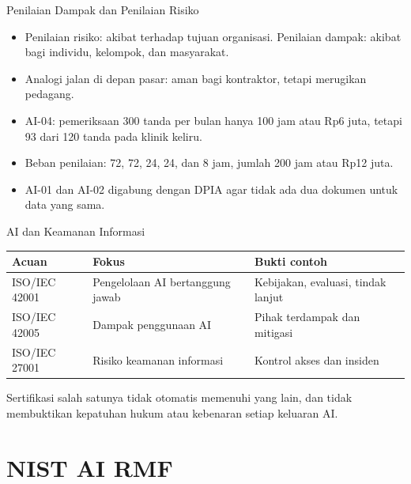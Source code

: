 \documentclass[aspectratio=169, table, 12pt]{beamer}
\begin{document}
\begin{frame}{{\Large Penilaian Dampak dan Penilaian Risiko}}
  \vspace{6pt}
  \small
  \begin{itemize}
    \item Penilaian risiko: akibat terhadap tujuan organisasi. Penilaian dampak: akibat bagi
          individu, kelompok, dan masyarakat.
    \item Analogi jalan di depan pasar: aman bagi kontraktor, tetapi merugikan pedagang.
    \item AI-04: pemeriksaan 300 tanda per bulan hanya 100 jam atau Rp6 juta, tetapi 93 dari 120
          tanda pada klinik keliru.
    \item Beban penilaian: 72, 72, 24, 24, dan 8 jam, jumlah 200 jam atau Rp12 juta.
    \item AI-01 dan AI-02 digabung dengan DPIA agar tidak ada dua dokumen untuk data yang sama.
  \end{itemize}
\end{frame}

\begin{frame}{{\Large AI dan Keamanan Informasi}}
  \vspace{4pt}
  \footnotesize
  \begin{tabularx}{\textwidth}{|>{\raggedright\arraybackslash}X|>{\raggedright\arraybackslash}X|>{\raggedright\arraybackslash}X|}
    \hline
    \textbf{Acuan} & \textbf{Fokus} & \textbf{Bukti contoh} \\ \hline
    ISO/IEC 42001 & Pengelolaan AI bertanggung jawab & Kebijakan, evaluasi, tindak lanjut \\ \hline
    ISO/IEC 42005 & Dampak penggunaan AI & Pihak terdampak dan mitigasi \\ \hline
    ISO/IEC 27001 & Risiko keamanan informasi & Kontrol akses dan insiden \\ \hline
  \end{tabularx}

  \vspace{8pt}
  \small Sertifikasi salah satunya tidak otomatis memenuhi yang lain, dan tidak membuktikan
  kepatuhan hukum atau kebenaran setiap keluaran AI.
\end{frame}

\section{NIST AI RMF}
\end{document}
